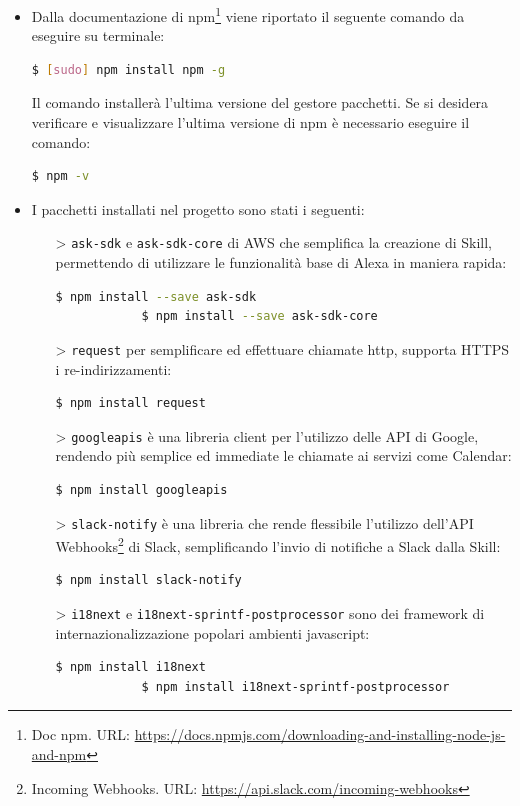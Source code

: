 \begin{itemize}
    \item Dalla documentazione di npm\footnote{Doc npm. URL: \href{https://docs.npmjs.com/downloading-and-installing-node-js-and-npm}{https://docs.npmjs.com/downloading-and-installing-node-js-and-npm}} viene riportato il seguente comando da eseguire su terminale:
    \begin{lstlisting}[language=bash]
		$ [sudo] npm install npm -g
	\end{lstlisting}
	Il comando installerà l'ultima versione del gestore pacchetti. Se si desidera verificare e visualizzare l'ultima versione di npm è necessario eseguire il comando: 
	\begin{lstlisting}[language=bash]
		$ npm -v
	\end{lstlisting}
	\item I pacchetti installati nel progetto sono stati i seguenti:
	\begin{itemize}
	    \item[>] \texttt{ask-sdk} e \texttt{ask-sdk-core} di AWS che semplifica la creazione di Skill, permettendo di utilizzare le funzionalità base di Alexa in maniera rapida:
	    \begin{lstlisting}[language=bash]
		    $ npm install --save ask-sdk
		    $ npm install --save ask-sdk-core
	    \end{lstlisting}
	    \item[>] \texttt{request} per semplificare ed effettuare chiamate http, supporta HTTPS i re-indirizzamenti:
	    \begin{lstlisting}[language=bash]
		    $ npm install request
	    \end{lstlisting}
	    \item[>] \texttt{googleapis} è una libreria client per l'utilizzo delle API di Google, rendendo più semplice ed immediate le chiamate ai servizi come Calendar:
	    \begin{lstlisting}[language=bash]
		    $ npm install googleapis
	    \end{lstlisting}
	    \item[>] \texttt{slack-notify} è una libreria che rende flessibile l'utilizzo dell'API Webhooks\footnote{Incoming Webhooks. URL: \href{https://api.slack.com/incoming-webhooks}{https://api.slack.com/incoming-webhooks}} di Slack, semplificando l'invio di notifiche a Slack dalla Skill:
	    \begin{lstlisting}[language=bash]
		    $ npm install slack-notify
	    \end{lstlisting}
	    \item[>] \texttt{i18next} e \texttt{i18next-sprintf-postprocessor} sono dei framework di internazionalizzazione popolari ambienti javascript:
	    \begin{lstlisting}[language=bash]
		    $ npm install i18next
		    $ npm install i18next-sprintf-postprocessor
	    \end{lstlisting}
	\end{itemize}
\end{itemize}

